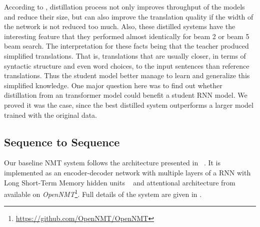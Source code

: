 \documentclass[11pt,a4paper]{article}
\begin{document}
According to , distillation process not only improves throughput of the models and reduce their size, but can also improve the translation quality if the width of the network is not reduced too much. Also, these distilled systems have the interesting feature that they performed almost identically for beam 2 or beam 5 beam search. The interpretation for these facts being that the teacher produced simplified translations. That is, translations that are usually closer, in terms of syntactic structure and even word choices, to the input sentences than reference translations. Thus the student model better manage to learn and generalize this simplified knowledge. One major question here was to find out whether distillation from an transformer model could benefit a student RNN model. We proved it was the case, since the best distilled system outperforms a larger model trained with the original data.

\subsection{Sequence to Sequence}
\label{seq2seq}

Our baseline NMT system follows the architecture presented in ~. It is implemented as an encoder-decoder network with multiple layers of a RNN with Long Short-Term Memory hidden units ~\cite{DBLP:journals/corr/ZarembaSV14} and attentional architecture from ~ available on \textit{OpenNMT}\footnote{\url{https://github.com/OpenNMT/OpenNMT}}. Full details of the system are given in .
\end{document}
